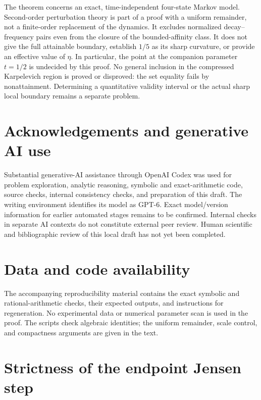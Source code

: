 \documentclass[11pt,a4paper]{article}
\begin{document}
The theorem concerns an exact, time-independent four-state Markov model.
Second-order perturbation theory is part of a proof with a uniform
remainder, not a finite-order replacement of the dynamics. It excludes
normalized decay--frequency pairs even from the closure of the
bounded-affinity class. It does not give the full attainable boundary,
establish $1/5$ as its sharp curvature, or provide an effective value of
$\eta$. In particular, the point at the companion parameter $t=1/2$
is undecided by this proof. No general inclusion in the compressed
Karpelevich region is proved or disproved: the set equality fails by
nonattainment. Determining a quantitative validity interval or the actual
sharp local boundary remains a separate problem.

\section*{Acknowledgements and generative AI use}

Substantial generative-AI assistance through OpenAI Codex was used for
problem exploration, analytic reasoning, symbolic and exact-arithmetic
code, source checks, internal consistency checks, and preparation of this
draft. The writing environment identifies its model as GPT-6. Exact
model/version information for earlier automated stages remains to be
confirmed. Internal checks in separate AI contexts do not constitute
external peer review. Human scientific and bibliographic review of this
local draft has not yet been completed.

\section*{Data and code availability}

The accompanying reproducibility material contains the exact symbolic
and rational-arithmetic checks, their expected outputs, and instructions
for regeneration. No experimental data or numerical parameter scan is
used in the proof. The scripts check algebraic identities; the uniform
remainder, scale control, and compactness arguments are given in the text.

\appendix
\section{Strictness of the endpoint Jensen step}\label{app:jensen}
\end{document}
